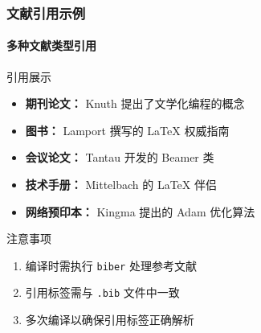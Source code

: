 \begin{frame}
\frametitle{文献引用示例}
\framesubtitle{多种文献类型引用}

\begin{block}{引用展示}
\begin{itemize}
  \item \textbf{期刊论文：} Knuth 提出了文学化编程的概念~\cite{knuth1984}
  \item \textbf{图书：} Lamport 撰写的 \LaTeX{} 权威指南~\cite{lamport1994}
  \item \textbf{会议论文：} Tantau 开发的 Beamer 类~\cite{tantau2004}
  \item \textbf{技术手册：} Mittelbach 的 \LaTeX{} 伴侣~\cite{mittelbach2004}
  \item \textbf{网络预印本：} Kingma 提出的 Adam 优化算法~\cite{kingma2017adammethodstochasticoptimization}
\end{itemize}
\end{block}

\begin{alertblock}{注意事项}
\begin{enumerate}
  \item 编译时需执行 \texttt{biber} 处理参考文献
  \item 引用标签需与 \texttt{.bib} 文件中一致
  \item 多次编译以确保引用标签正确解析
\end{enumerate}
\end{alertblock}
\end{frame}
